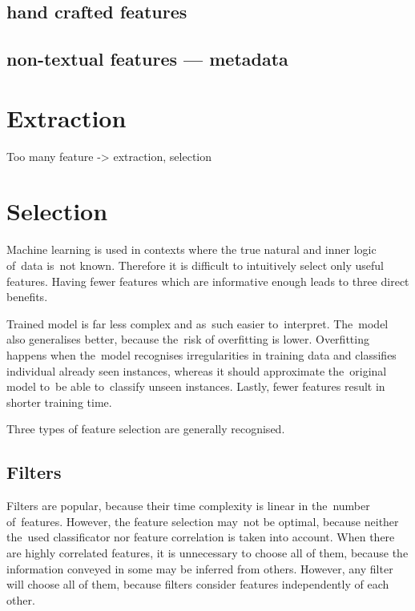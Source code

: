 \subsection{hand crafted features}

\subsection{non-textual features --- metadata}



\section{Extraction}

Too many feature -> extraction, selection



\section{Selection}

Machine learning is used in contexts where the true natural and inner logic of~data is~not known. Therefore it is difficult to intuitively select only useful features. Having fewer features which are informative enough leads to three direct benefits.

Trained model is far less complex and as~such easier to~interpret. The~model also generalises better, because the~risk of overfitting is lower. Overfitting happens when the~model recognises irregularities in training data and classifies individual already seen instances, whereas it should approximate the~original model to~be able to~classify unseen instances. Lastly, fewer features result in shorter training time.

Three types of feature selection are generally recognised.



\subsection{Filters}

Filters are popular, because their time complexity is linear in the~number of~features. However, the feature selection may~not be optimal, because neither the~used classificator nor feature correlation is taken into account. When there are highly correlated features, it is unnecessary to choose all of them, because the information conveyed in some may be inferred from others. However, any filter will choose all of them, because filters consider features independently of each other.

